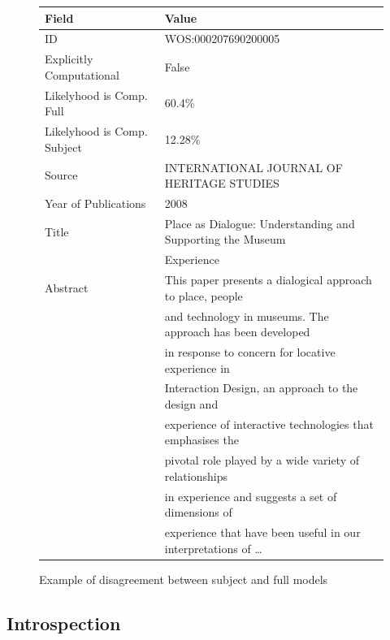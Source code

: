 \documentclass[12pt, a4paper]{article}
\begin{document}
\begin{figure}[H]
	\begin{tabular}{ll}
		\toprule
		Field & Value\\
		\midrule
		ID & WOS:000207690200005 \\
		Explicitly Computational & False \\
		Likelyhood is Comp.  Full& 60.4\% \\
		Likelyhood is Comp. Subject& 12.28\%\\
		Source & INTERNATIONAL JOURNAL OF HERITAGE STUDIES \\
		Year of Publications & 2008 \\
		Title &  Place as Dialogue: Understanding and Supporting the Museum\\
		&Experience \\
		\midrule
		Abstract &  This paper presents a dialogical approach to place, people\\
		&and technology in museums. The approach has been developed\\
		&in response to concern for locative experience in\\
		&Interaction Design, an approach to the design and\\
		&experience of interactive technologies that emphasises the\\
		&pivotal role played by a wide variety of relationships\\
		&in experience and suggests a set of dimensions of\\
		&experience that have been useful in our interpretations of \dots\\
		\bottomrule
	\end{tabular}
	\caption{Example of disagreement between subject and full models}\label{subFalse}
\end{figure}


\subsection{Introspection}
\end{document}

